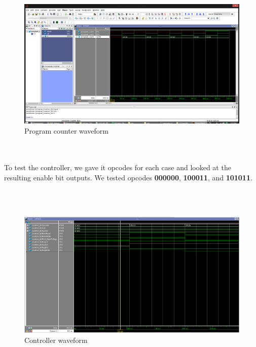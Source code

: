 \documentclass{article}
\begin{document}
\\ \\
\begin{figure}[!ht]
	\centering
		\includegraphics[width=1\textwidth]{pc_waveform.png}
		\caption{Program counter waveform}
\end{figure}
\\ \\

To test the controller, we gave it opcodes for each case and looked at the resulting enable bit outputs. We tested opcodes \textbf{000000}, \textbf{100011}, and \textbf{101011}.

\\ \\
\begin{figure}[!ht]
	\centering
		\includegraphics[width=1\textwidth]{control_waveform.png}
		\caption{Controller waveform}
\end{figure}
\\ \\
\end{document}
